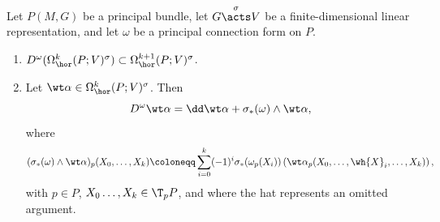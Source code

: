 \begin{prop}[{{\cite[Prop.~1.4.3]{RS2}}}]\label{prop 1.4.3 RS2}
    Let $P(M,G)$ be a principal bundle, let $G\overset{\sigma}{\acts}V$ be a finite-dimensional linear representation, and let $\omega$ be a principal connection form on $P$.
    \begin{enumerate}
        \item $D^\omega(\Omega^k_{\hor}(P;V)^\sigma)\subset \Omega^{k+1}_{\hor}(P;V)^\sigma$.
        \item Let $\wt\alpha\in\Omega^k_{\hor}(P;V)^\sigma$. Then
        \[D^\omega\wt\alpha=\dd\wt\alpha+\sigma_\ast(\omega)\wedge \wt\alpha,\label{eq 1.4.1 RS2}\]
        where
        \[(\sigma_\ast(\omega)\wedge\wt\alpha)_p(X_0,\ldots,X_k)\coloneqq \sum_{i=0}^k (-1)^i\sigma_\ast(\omega_p(X_i))\left(\wt\alpha_p(X_0,\ldots,\wh{X}_i,\ldots,X_k)\right),\]
        with $p\in P$, $X_0\ldots,X_k\in \T_pP$, and where the hat represents an omitted argument.
    \end{enumerate}
\end{prop}
